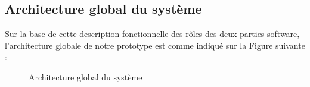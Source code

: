 \newpage
\subsection{Architecture global du système}
Sur la base de cette description fonctionnelle des rôles des deux parties software, l’architecture globale de notre prototype est comme indiqué sur la Figure suivante : 
\begin{figure}[hbt]
\centering
\right

\label{fig:Architecture global du système}
\caption{Architecture global du système}
\end{figure}

\newpage
